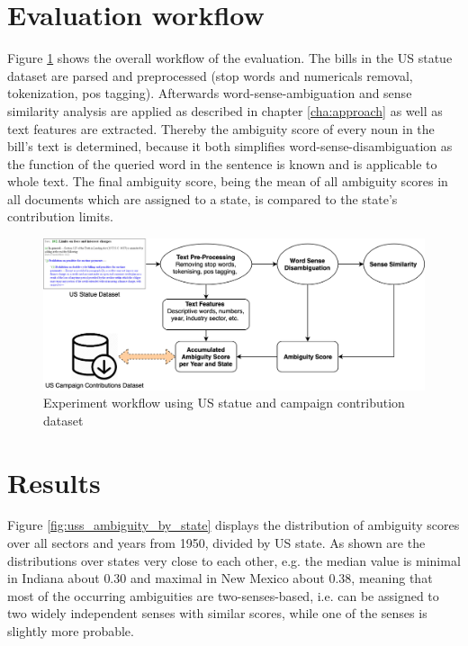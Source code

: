 \documentclass{custom_report}
\begin{document}
\section{Evaluation workflow}
Figure \ref{fig:workflow} shows the overall workflow of the evaluation. The bills in the US statue dataset are parsed and preprocessed (stop words and numericals removal, tokenization, pos tagging). Afterwards word-sense-ambiguation and sense similarity analysis are applied as described in chapter \ref{cha:approach} as well as text features are extracted. Thereby the ambiguity score of every noun in the bill's text is determined, because it both simplifies word-sense-disambiguation as the function of the queried word in the sentence is known and is applicable to whole text. The final ambiguity score, being the mean of all ambiguity scores in all documents which are assigned to a state, is compared to the state's contribution limits.

\begin{figure}[h!]
\begin{center}
\includegraphics[width=12cm]{images/workflow.png}
\end{center}
\caption{Experiment workflow using US statue and campaign contribution dataset}
\label{fig:workflow}
\end{figure}

\section{Results}
Figure \ref{fig:uss_ambiguity_by_state} displays the distribution of ambiguity scores over all sectors and years from 1950, divided by US state. As shown are the distributions over states very close to each other, e.g. the median value is minimal in Indiana about $0.30$ and maximal in New Mexico about $0.38$, meaning that most of the occurring ambiguities are two-senses-based, i.e. can be assigned to two widely independent senses with similar scores, while one of the senses is slightly more probable. 
\end{document}
